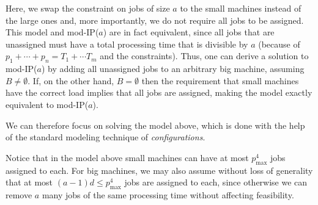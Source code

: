 \documentclass{article}
\newcommand{\mIP}{mod-IP($a$)}
\begin{document}
Here, we swap the constraint on jobs of size $a$ to the small machines instead of the large ones
and, more importantly, we do not require all jobs to be assigned.
This model and \mIP{} are in fact equivalent, since all jobs that are unassigned must have a total processing time
that is divisible by $a$ (because of $p_1 + \cdots + p_n = T_1 + \cdots T_m$ and the constraints). Thus,
one can derive a solution to \mIP{} by adding all unassigned jobs to an arbitrary big machine, assuming
$B\neq \emptyset$.
If, on the other hand, $B = \emptyset$ then the requirement that small machines have the correct load implies that all
jobs are assigned, making the model exactly equivalent to \mIP{}.

We can therefore focus on solving the model above, which is done with the help of the standard modeling technique 
of \emph{configurations}. 

Notice that in the model above small machines can have at most $p_{\max}^4$ jobs assigned
to each. For big machines, we may also assume without loss of generality that at most $(a-1)d \le p_{\max}^4$ jobs are
assigned to each, since otherwise we can remove $a$ many jobs of the same processing time without affecting feasibility. 
\end{document}
